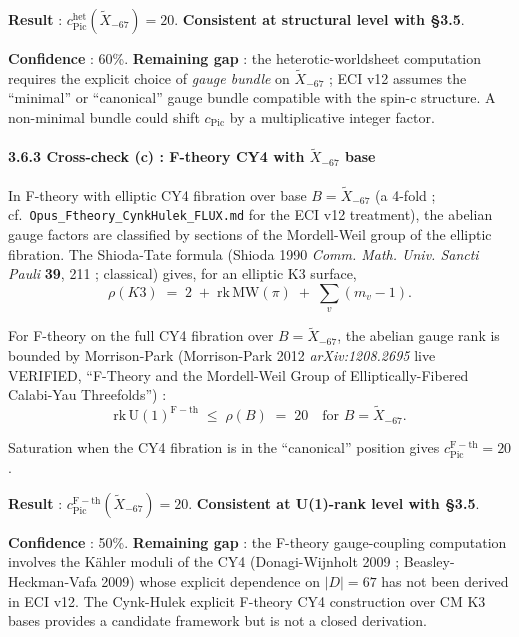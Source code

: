 \documentclass[
  11pt,
  a4paper,
]{article}
\begin{document}
\textbf{Result} : \(c_{\mathrm{Pic}}^{\mathrm{het}}(\tilde X_{-67}) = 20\). \textbf{Consistent at structural level with §3.5}.

\textbf{Confidence} : 60\%. \textbf{Remaining gap} : the heterotic-worldsheet computation requires the explicit choice of \emph{gauge bundle} on \(\tilde X_{-67}\) ; ECI v12 assumes the ``minimal'' or ``canonical'' gauge bundle compatible with the spin-c structure. A non-minimal bundle could shift \(c_{\mathrm{Pic}}\) by a multiplicative integer factor.

\hypertarget{cross-check-c-f-theory-cy4-with-tilde-x_-67-base}{%
\paragraph{\texorpdfstring{3.6.3 Cross-check (c) : F-theory CY4 with \(\tilde X_{-67}\) base}{3.6.3 Cross-check (c) : F-theory CY4 with \textbackslash tilde X\_\{-67\} base}}\label{cross-check-c-f-theory-cy4-with-tilde-x_-67-base}}

In F-theory with elliptic CY4 fibration over base \(B = \tilde X_{-67}\) (a 4-fold ; cf.~\texttt{Opus\_Ftheory\_CynkHulek\_FLUX.md} for the ECI v12 treatment), the abelian gauge factors are classified by sections of the Mordell-Weil group of the elliptic fibration. The Shioda-Tate formula (Shioda 1990 \emph{Comm. Math. Univ. Sancti Pauli} \textbf{39}, 211 ; classical) gives, for an elliptic K3 surface,
\[
\rho(K3) \;=\; 2 \;+\; \mathrm{rk}\,\mathrm{MW}(\pi) \;+\; \sum_v (m_v - 1).
\]

For F-theory on the full CY4 fibration over \(B = \tilde X_{-67}\), the abelian gauge rank is bounded by Morrison-Park (Morrison-Park 2012 \emph{arXiv:1208.2695} live VERIFIED, ``F-Theory and the Mordell-Weil Group of Elliptically-Fibered Calabi-Yau Threefolds'') :
\[
\mathrm{rk}\,\mathrm{U(1)}^{\mathrm{F-th}} \;\le\; \rho(B) \;=\; 20 \quad \text{for } B = \tilde X_{-67}.
\]

Saturation when the CY4 fibration is in the ``canonical'' position gives \(c_{\mathrm{Pic}}^{\mathrm{F-th}} = 20\).

\textbf{Result} : \(c_{\mathrm{Pic}}^{\mathrm{F-th}}(\tilde X_{-67}) = 20\). \textbf{Consistent at U(1)-rank level with §3.5}.

\textbf{Confidence} : 50\%. \textbf{Remaining gap} : the F-theory gauge-coupling computation involves the Kähler moduli of the CY4 (Donagi-Wijnholt 2009 ; Beasley-Heckman-Vafa 2009) whose explicit dependence on \(|D| = 67\) has not been derived in ECI v12. The Cynk-Hulek explicit F-theory CY4 construction over CM K3 bases provides a candidate framework but is not a closed derivation.
\end{document}
